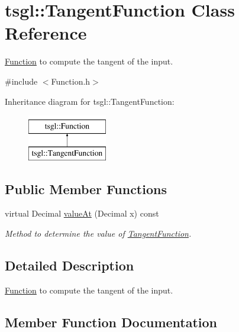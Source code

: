 \hypertarget{classtsgl_1_1_tangent_function}{}\section{tsgl\+:\+:Tangent\+Function Class Reference}
\label{classtsgl_1_1_tangent_function}


\hyperlink{classtsgl_1_1_function}{Function} to compute the tangent of the input.  




{\ttfamily \#include $<$Function.\+h$>$}

Inheritance diagram for tsgl\+:\+:Tangent\+Function\+:\begin{figure}[H]
\begin{center}
\leavevmode
\includegraphics[height=2.000000cm]{classtsgl_1_1_tangent_function}
\end{center}
\end{figure}
\subsection*{Public Member Functions}
\begin{DoxyCompactItemize}
\item 
virtual Decimal \hyperlink{classtsgl_1_1_tangent_function_a3737542399069ebce368a5b53ba8a563}{value\+At} (Decimal x) const 
\begin{DoxyCompactList}\small\item\em Method to determine the value of \hyperlink{classtsgl_1_1_tangent_function}{Tangent\+Function}. \end{DoxyCompactList}\end{DoxyCompactItemize}


\subsection{Detailed Description}
\hyperlink{classtsgl_1_1_function}{Function} to compute the tangent of the input. 

\subsection{Member Function Documentation}
\hypertarget{classtsgl_1_1_tangent_function_a3737542399069ebce368a5b53ba8a563}{}
